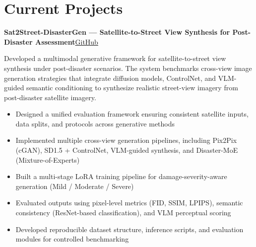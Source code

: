 \documentclass[10pt,letterpaper]{article}
\newcommand{\entry}[2]{%
  \par\vspace{0.30em}\noindent\textbf{#1}\hfill{\small #2}\par}
\newenvironment{tight}
  {\begin{itemize}[leftmargin=1.25em,itemsep=0.10em,topsep=0.20em,parsep=0pt,label=\textbullet]}
  {\end{itemize}}
\begin{document}
\section{Current Projects}

\entry{Sat2Street-DisasterGen --- Satellite-to-Street View Synthesis for Post-Disaster Assessment}{\href{https://github.com/rayford295/Sat2Street-DisasterGen}{GitHub}}
\vspace{0.15em}
Developed a multimodal generative framework for satellite-to-street view synthesis under post-disaster scenarios. The system benchmarks cross-view image generation strategies that integrate diffusion models, ControlNet, and VLM-guided semantic conditioning to synthesize realistic street-view imagery from post-disaster satellite imagery.
\begin{tight}
  \item Designed a unified evaluation framework ensuring consistent satellite inputs, data splits, and protocols across generative methods
  \item Implemented multiple cross-view generation pipelines, including Pix2Pix (cGAN), SD1.5 + ControlNet, VLM-guided synthesis, and Disaster-MoE (Mixture-of-Experts)
  \item Built a multi-stage LoRA training pipeline for damage-severity-aware generation (Mild / Moderate / Severe)
  \item Evaluated outputs using pixel-level metrics (FID, SSIM, LPIPS), semantic consistency (ResNet-based classification), and VLM perceptual scoring
  \item Developed reproducible dataset structure, inference scripts, and evaluation modules for controlled benchmarking
\end{tight}
\end{document}
